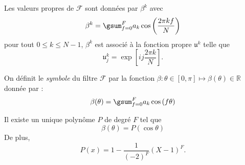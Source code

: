 \begin{theoreme}
Les valeurs propres de $\mathcal{F}$ sont données par $\beta^k$ avec 
\begin{equation}
\beta^k = \gsum_{f=0}^F a_k \cos \left( \dfrac{2 \pi k f}{N} \right)
\end{equation}
pour tout $0 \leq k \leq N-1$, $\beta^k$ est associé à la fonction propre $\mathfrak{u}^k$ telle que 
\begin{equation}
\mathfrak{u}^k_j = \exp \left[ i j \dfrac{2 \pi k}{N} \right].
\end{equation}
\end{theoreme}

On définit le \textit{symbole} du filtre $\mathcal{F}$ par la fonction $\beta : \theta \in [0, \pi] \mapsto \beta(\theta) \in \mathbb{R}$ donnée par :
\begin{equation}
\beta( \theta ) = \gsum_{f=0}^F a_k \cos \left( f \theta \right)
\end{equation}

\begin{proposition}
Il existe un unique polynôme $P$ de degré $F$ tel que 
\begin{equation}
\beta(\theta) = P(\cos \theta )
\end{equation}
De plus,
\begin{equation}
P(x) = 1 -\dfrac{1}{(-2)^F} (X - 1)^F.
\end{equation}
\end{proposition}

